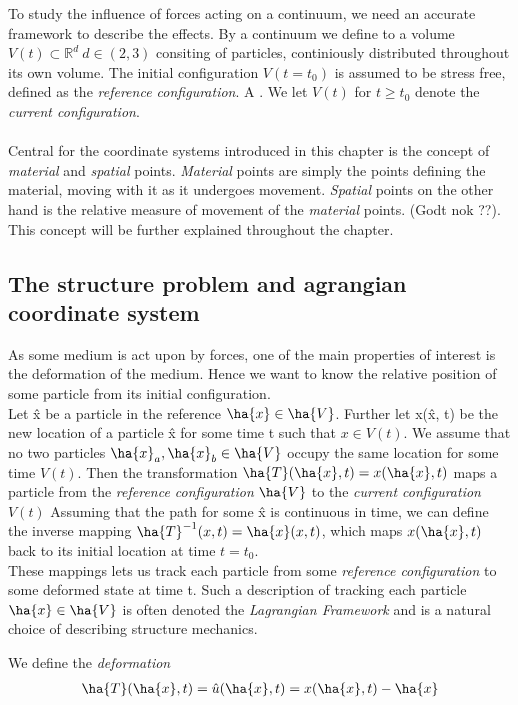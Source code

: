 To study the influence of forces acting on a continuum, we need an accurate framework to describe the effects. By a continuum we define  to a volume $V(t) \subset \mathbb{R}^d \ d \in (2, 3)$ 
consiting of particles,  continiously distributed throughout its own volume. The initial configuration $V(t = t_0)$  is assumed to be stress free,  defined as the \textit{reference configuration}. A
. We let $V(t)$ for 
$t \geq t_0$ denote the \textit{current configuration}. \\ \\
Central for the coordinate systems introduced in this chapter is the concept of \textit{material} and \textit{spatial} points. \textit{Material} points are simply the points defining the material, moving with it as it undergoes movement. \textit{Spatial} points on the other hand is the relative measure of movement of the \textit{material} points. (Godt nok ??). This concept will be further explained throughout the chapter.

\subsection{The structure problem and agrangian coordinate system}
As some medium is act upon by forces, one of the main properties of interest is the deformation of the medium. Hence we want to know the relative position of some particle from its initial configuration. \\
Let \^{x} be a particle in the reference  $\ha{x} \in \ha{V}$. 
Further let x(\^x, t) be the new location of a particle \^x for some time t such that $x \in V(t)$. We assume that no two particles $\ha{x}_a, \ha{x}_b \in \ha{V}$ occupy the same location for some time $V(t)$.
Then the transformation $\ha{T}(\ha{x}, t) = x(\ha{x}, t)$ maps a particle  from the \textit{reference configuration} $\ha{V}$ to the  \textit{current configuration} $V(t)$
Assuming that the path for some \^{x} is continuous in time, we can define the inverse mapping $\ha{T}^{-1}(x, t) = \ha{x}(x, t)$, which maps $x(\ha{x}, t)$ back to its initial location at time $t = t_0$. \\
These mappings lets us track each particle from some \textit{reference configuration} to some deformed state at time t. 
Such a description of tracking each particle $\ha{x} \in \ha{V}$ is often denoted the \textit{Lagrangian Framework} and is a natural choice of describing structure mechanics. 

We define the \textit{deformation} 
\begin{align}
\ha{T}(\ha{x}, t) = \hat{u}(\ha{x},t) = x(\ha{x},t) - \ha{x} 
\end{align}

